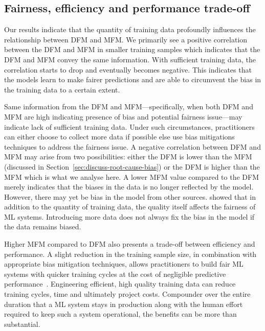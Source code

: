 \documentclass{article}
\begin{document}
\subsection{Fairness, efficiency and performance trade-off}\label{sec:discuss-fair-eff-perf-trade}

Our results indicate that the quantity of training data profoundly
influences the relationship between DFM and MFM. We primarily see a
positive correlation between the DFM and MFM in smaller training
samples which indicates that the DFM and MFM convey the same
information. With sufficient training data, the correlation starts to
drop and eventually becomes negative. This indicates that the models
learn to make fairer predictions and are able to circumvent the bias
in the training data to a certain extent.

Same information from the DFM and MFM---specifically, when both DFM
and MFM are high indicating presence of bias and potential fairness
issue---may indicate lack of sufficient training data. Under such
circumstances, practitioners can either choose to collect more data if
possible else use bias mitigations techniques to address the fairness
issue. A negative correlation between DFM and MFM may arise from two
possibilities: either the DFM is lower than the MFM (discussed in
Section \ref{sec:discuss-root-cause-bias}) or the DFM is higher than
the MFM which is what we analyse here. A lower MFM value compared to
the DFM merely indicates that the biases in the data is no longer
reflected by the model. However, there may yet be bias in the model
from other sources. \citeauthor{zhang2021ignorance} showed that in
addition to the quantity of training data, the quality itself affects
the fairness of ML systems. Introducing more data does not always fix
the bias in the model if the data remains biased.

Higher MFM compared to DFM also presents a trade-off between
efficiency and performance. A slight reduction in the training sample
size, in combination with appropriate bias mitigation techniques,
allows practitioners to build fair ML systems with quicker training
cycles at the cost of negligible predictive performance \cite{CITEME}.
Engineering efficient, high quality training data can reduce training
cycles, time and ultimately project costs. Compounder over the entire
duration that a ML system stays in production along with the human
effort required to keep such a system operational, the benefits can be
more than substantial.
\end{document}
